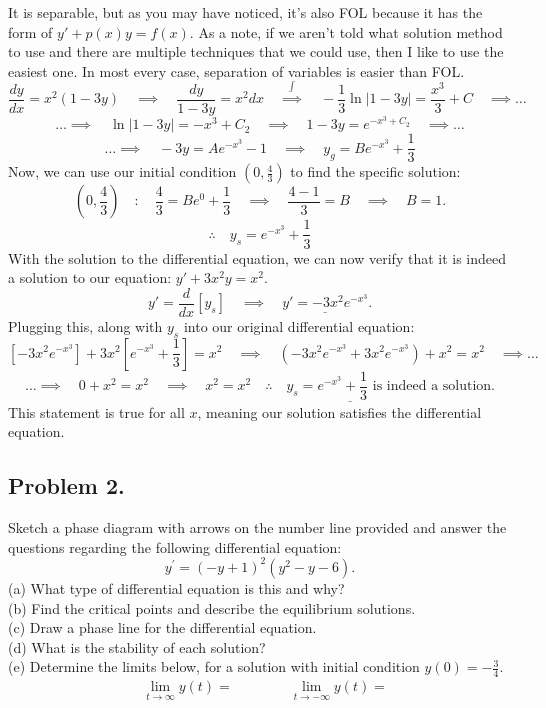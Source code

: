 \documentclass[a4paper,12pt]{article} %
\begin{document}
It is separable, but as you may have noticed, it's also FOL because it has the form of $y' + p(x)y = f(x)$. As a note, if we aren't told what solution method to use and there are multiple techniques that we could use, then I like to use the easiest one. In most every case, separation of variables is easier than FOL.
$$ \frac{dy}{dx} = x^2 (1-3y) \quad\implies\quad \frac{dy}{1-3y} = x^2 dx \quad\overset{\int}\implies\quad -\frac{1}{3}\ln{|1-3y|} = \frac{x^3}{3} + C \quad\implies\ldots $$
$$ \ldots\implies\quad \ln{|1-3y|} = -x^3 + C_2 \quad\implies\quad 1-3y = e^{-x^3 + C_2} \quad\implies\ldots$$
$$ \ldots\implies\quad -3y = Ae^{-x^3} - 1 \quad\implies\quad \boxed{y_g = Be^{-x^3} + \frac{1}{3}} $$
Now, we can use our initial condition $(0, \frac{4}{3})$ to find the specific solution:
$$ \left(0, \frac{4}{3}\right)\quad:\quad \frac{4}{3} = Be^{0} + \frac{1}{3} \quad\implies\quad \frac{4-1}{3} = B \quad\implies\quad B=1. $$
$$ \therefore\quad \boxed{y_s = e^{-x^3} + \frac{1}{3}} $$
With the solution to the differential equation, we can now verify that it is indeed a solution to our equation: $y' +3x^2y = x^2$.
$$ y' = \frac{d}{dx}\left[y_s\right] \quad\implies\quad \underline{y' = -3x^2e^{-x^3}}. $$
Plugging this, along with $y_s$ into our original differential equation:
$$ \left[-3x^2e^{-x^3}\right] + 3x^2\left[e^{-x^3} + \frac{1}{3}\right] = x^2 \quad\implies\quad (-3x^2e^{-x^3} + 3x^2e^{-x^3}) + x^2 = x^2 \quad\implies\ldots$$
$$ \ldots\implies\quad 0 + x^2 = x^2 \quad\implies\quad \underline{\boxed{x^2=x^2 \quad\therefore\quad {\text{$y_s = e^{-x^3} + \frac{1}{3}$ is indeed a solution.}}}} $$
This statement is true for all $x$, meaning our solution satisfies the differential equation.

\subsection*{Problem 2.} 
Sketch a phase diagram with arrows on the number line provided and answer the questions regarding the following differential equation:
$$ y^{\prime} = (-y+1)^2(y^2-y-6). $$
(a) What type of differential equation is this and why?\\
(b) Find the critical points and describe the equilibrium solutions.\\
(c) Draw a phase line for the differential equation.\\
(d) What is the stability of each solution?\\
(e) Determine the limits below, for a solution with initial condition $y(0)=-\frac{3}{4}$.
$$
\begin{aligned}
& \lim _{t \rightarrow \infty} y(t)=  \quad\quad\quad\quad \lim _{t \rightarrow-\infty} y(t)=
\end{aligned}
$$\\
\\
\\
\\
\\
\\
\end{document}
